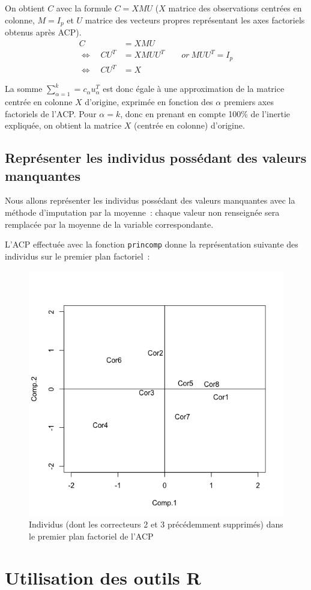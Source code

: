 \documentclass[a4paper,10pt]{report}
\begin{document}
On obtient $C$ avec la formule $C = XMU$ ($X$ matrice des observations centrées en colonne, $M = I_p$ et $U$ matrice des vecteurs propres représentant les axes factoriels obtenus après ACP).
\begin{align*}
C &= XMU \\
\Longleftrightarrow \quad CU^T &= XMUU^T \qquad or\ MUU^T = I_p \\
\Longleftrightarrow \quad CU^T &= X
\end{align*}



La somme $\sum\limits_{\alpha=1}^k = c_\alpha u_{\alpha}^T$ est donc égale à une approximation de la matrice centrée en colonne $X$ d'origine, exprimée en fonction des $\alpha$ premiers axes factoriels de l'ACP. Pour $\alpha = k$, donc en prenant en compte 100\% de l'inertie expliquée, on obtient la matrice $X$ (centrée en colonne) d'origine.



\subsection{Représenter les individus possédant des valeurs manquantes}

Nous allons représenter les individus possédant des valeurs manquantes avec la méthode d'imputation par la moyenne~: chaque valeur non renseignée sera remplacée par la moyenne de la variable correspondante.

L'ACP effectuée avec la fonction \texttt{princomp} donne la représentation suivante des individus sur le premier plan factoriel~:

\begin{figure}[H]
	\centering
	\captionsetup{justification=centering, margin=4cm}
	\includegraphics[width=.3\linewidth]{img/2-1-5-individus-with-na-premier-plan-factoriel}
	\caption{\scriptsize Individus (dont les correcteurs 2 et 3 précédemment supprimés) dans le premier plan factoriel de l'ACP}
	\label{fig:individus_with_na_premier_plan_factoriel}
\end{figure}


\section{Utilisation des outils R}
\end{document}
